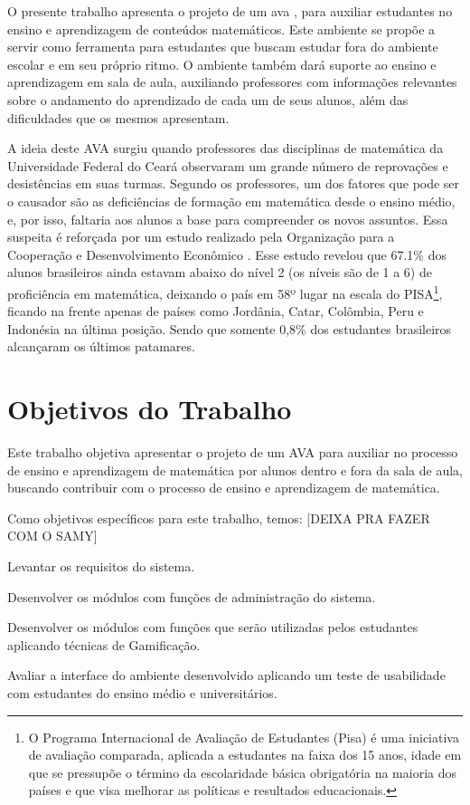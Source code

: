 O presente trabalho apresenta o projeto de um \gls{ava} \cite{valentini2010aprendizagem}, para auxiliar 
estudantes no ensino e aprendizagem de conteúdos matemáticos. Este ambiente se propõe a servir como ferramenta para estudantes que buscam 
estudar fora do ambiente escolar e em seu próprio ritmo. O ambiente também dará suporte ao ensino e aprendizagem em sala de aula, 
auxiliando professores com informações relevantes sobre o andamento do aprendizado de cada um de seus alunos, além das dificuldades que os 
mesmos apresentam.

A ideia deste AVA surgiu quando professores das disciplinas de matemática da Universidade Federal do Cear\'a observaram um grande número de 
reprovações e desistências em suas turmas. Segundo os professores, um dos fatores que pode ser o causador são as deficiências de formação em 
matemática desde o ensino médio, e, por isso, faltaria aos alunos a base para compreender os novos assuntos. Essa suspeita é reforçada por 
um estudo realizado pela Organização para a Cooperação e Desenvolvimento Econômico \cite{pisainfocus2016}. Esse estudo revelou que 67.1\% 
dos alunos brasileiros ainda estavam abaixo do nível 2 (os níveis são de 1 a 6) de proficiência em matem\'atica, deixando o país em 58º 
lugar 
na escala do PISA\footnote{O 
Programa Internacional de Avaliação de Estudantes (Pisa) é uma iniciativa de avaliação comparada, aplicada a estudantes na faixa dos 15 
anos, idade em que se pressupõe o término da escolaridade básica obrigatória na maioria dos países e que visa melhorar as políticas e 
resultados educacionais.}, ficando na frente apenas de países como Jordânia, Catar, Colômbia, Peru e Indonésia na \'ultima posi\c{c}\~ao. 
Sendo que somente 0,8\% dos estudantes brasileiros alcançaram os últimos patamares.

\section{Objetivos do Trabalho}

Este trabalho objetiva apresentar o projeto de um AVA para auxiliar no processo de ensino e aprendizagem de matemática por alunos dentro e 
fora da sala de aula, buscando contribuir com o processo de ensino e aprendizagem de matem\'atica. 

Como objetivos específicos para este trabalho, temos: 
[DEIXA PRA FAZER COM O SAMY]
\begin{alineas}
  \item Levantar os requisitos do sistema.
  \item Desenvolver os módulos com funções de administração do sistema.
  \item Desenvolver os módulos com funções que serão utilizadas pelos estudantes aplicando técnicas de Gamificação.
  \item Avaliar a interface do ambiente desenvolvido aplicando um teste de usabilidade com estudantes do ensino m\'edio e universit\'arios.
\end{alineas}


